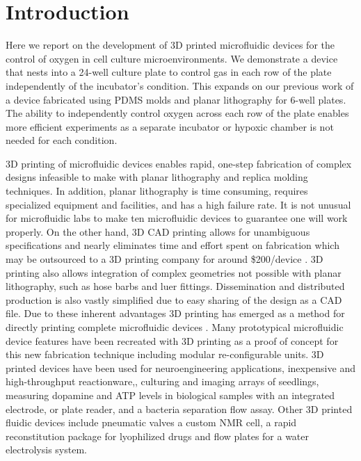 \documentclass[10pt,letterpaper]{article}
\begin{document}
\section*{Introduction}
Here we report on the development of 3D printed microfluidic devices for the control of oxygen in cell culture microenvironments.
We demonstrate a device that nests into a 24-well culture plate to control gas in each row of the plate independently of the incubator's condition.
This expands on our previous work of a device fabricated using PDMS molds and planar lithography for 6-well plates\cite{Oppegard2009,Oppegard2010}.
The ability to independently control oxygen across each row of the plate enables more efficient experiments as a separate incubator or hypoxic chamber is not needed for each condition.

3D printing of microfluidic devices enables rapid, one-step fabrication of complex designs infeasible to make with planar lithography and replica molding techniques\cite{Waldbaur2011,Chen2014a}.
In addition, planar lithography is time consuming, requires specialized equipment and facilities, and has a high failure rate.
It is not unusual for microfluidic labs to make ten microfluidic devices to guarantee one will work properly.
On the other hand, 3D CAD printing allows for unambiguous specifications and nearly eliminates time and effort spent on fabrication which may be outsourced to a 3D printing company for around \$200/device \cite{Au2014}.
3D printing also allows integration of complex geometries not possible with planar lithography, such as hose barbs and luer fittings.
Dissemination and distributed production is also vastly simplified due to easy sharing of the design as a CAD file.
Due to these inherent advantages 3D printing has emerged as a method for directly printing complete microfluidic devices \cite{Au2014,Comina2014, Chen2014,Shallan2014,Bhargava2014}. 
Many prototypical microfluidic device features have been recreated with 3D printing as a proof of concept for this new fabrication technique \cite{ Au2014, Shallan2014} including modular re-configurable units\cite{Yuen2008,Bhargava2014,Lee2014}.
3D printed devices have been used for neuroengineering applications\cite{Tek2008}, inexpensive and high-throughput reactionware,\cite{Kitson2012,Symes2012, Kitson2014}, culturing and imaging arrays of seedlings\cite{Busch2012}, measuring dopamine and ATP levels in biological samples with an integrated electrode\cite{Erkal2014}, or plate reader\cite{Chen2014}, and a bacteria separation flow assay\cite{Lee2014a,Lee2015}. 
Other 3D printed fluidic devices include pneumatic valves\cite{Au2015} a custom NMR cell\cite{Causier2015}, a rapid reconstitution package for lyophilized drugs\cite{Chi2014} and flow plates for a water electrolysis system\cite{Chisholm2014}.
\end{document}
